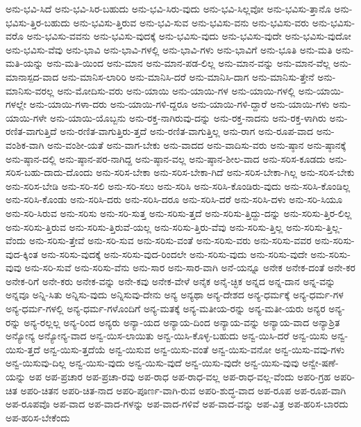 {ಅನು-ಭವಿ-ಸಿದೆ
ಅನು-ಭವಿ-ಸಿರ-ಬಹುದು
ಅನು-ಭವಿ-ಸಿರು-ವುದು
ಅನು-ಭವಿ-ಸಿಲ್ಲವೋ
ಅನು-ಭವಿಸು-ತ್ತಾನೊ
ಅನು-ಭವಿಸು-ತ್ತಿರ-ಬಹುದು
ಅನು-ಭವಿಸು-ತ್ತಿರುವ
ಅನು-ಭವಿ-ಸುವ
ಅನು-ಭವಿಸು-ವನು
ಅನು-ಭವಿಸು-ವರು
ಅನು-ಭವಿಸು-ವರೊ
ಅನು-ಭವಿಸು-ವವನು
ಅನು-ಭವಿಸು-ವುದಕ್ಕೆ
ಅನು-ಭವಿಸು-ವುದು
ಅನು-ಭವಿಸು-ವುದೇ
ಅನು-ಭವಿಸು-ವುದೋ
ಅನು-ಭವಿಸು-ವೆವು
ಅನು-ಭಾವಿ
ಅನು-ಭಾವಿ-ಗಳಲ್ಲಿ
ಅನು-ಭಾವಿ-ಗಳು
ಅನು-ಭಾವಿಗೆ
ಅನು-ಭೂತಿ
ಅನು-ಮತಿ
ಅನು-ಮತಿ-ಯನ್ನು
ಅನು-ಮತಿ-ಯಿಂದ
ಅನು-ಮಾನ
ಅನು-ಮಾನ-ಪಡ-ಲಿಲ್ಲ
ಅನು-ಮಾನ-ವನ್ನು
ಅನು-ಮಾನ-ವೆಲ್ಲ
ಅನು-ಮಾನಾಸ್ಪದ-ವಾದ
ಅನು-ಮಾನಿಸ-ಲಾರಿರಿ
ಅನು-ಮಾನಿಸಿ-ದರೆ
ಅನು-ಮಾನಿಸಿ-ದಾಗ
ಅನು-ಮಾನಿಸು-ತ್ತೇನೆ
ಅನು-ಮಾನಿಸು-ವರಲ್ಲ
ಅನು-ಮೋದಿಸು-ವರು
ಅನು-ಯಾಯಿ
ಅನು-ಯಾಯಿ-ಗಳ
ಅನು-ಯಾಯಿ-ಗಳಲ್ಲಿ
ಅನು-ಯಾಯಿ-ಗಳಲ್ಲೇ
ಅನು-ಯಾಯಿ-ಗಳಾ-ದರು
ಅನು-ಯಾಯಿ-ಗಳಿ-ದ್ದರೂ
ಅನು-ಯಾಯಿ-ಗಳಿ-ದ್ದಾರೆ
ಅನು-ಯಾಯಿ-ಗಳು
ಅನು-ಯಾಯಿ-ಗಳೇ
ಅನು-ಯಾಯಿ-ಯೊಬ್ಬನು
ಅನು-ರಕ್ತ-ನಾಗಿರುವು-ದನ್ನು
ಅನು-ರಕ್ತ-ನಾದನು
ಅನು-ರಕ್ತ-ಳಾಗಿರು
ಅನು-ರಣಿತ-ವಾಗುತ್ತಿದೆ
ಅನು-ರಣಿತ-ವಾಗುತ್ತಿರು-ತ್ತದೆ
ಅನು-ರಣಿತ-ವಾಗುತ್ತಿಲ್ಲ
ಅನು-ರಾಗ
ಅನು-ರೂಪ-ವಾದ
ಅನು-ವಂಶಿಕ-ವಾಗಿ
ಅನು-ವಂಶೀ-ಯತೆ
ಅನು-ವಾಗ-ಬೇಕು
ಅನು-ವಾದದ
ಅನು-ವಾದಿಸು-ವರು
ಅನು-ಷ್ಠಾನ
ಅನು-ಷ್ಠಾನಕ್ಕೆ
ಅನು-ಷ್ಠಾನ-ದಲ್ಲಿ
ಅನು-ಷ್ಠಾನ-ಪರ-ನಾಗಿದ್ದ
ಅನು-ಷ್ಠಾನ-ವಲ್ಲ
ಅನು-ಷ್ಠಾನ-ಶೀಲ-ವಾದ
ಅನು-ಸರಿಸ-ಕೂಡದು
ಅನು-ಸರಿಸ-ಬಹು-ದಾದು-ದೊಂದು
ಅನು-ಸರಿಸ-ಬೇಕಾ
ಅನು-ಸರಿಸ-ಬೇಕಾ-ಗಿದೆ
ಅನು-ಸರಿಸ-ಬೇಕಾ-ಗಿಲ್ಲ
ಅನು-ಸರಿಸ-ಬೇಕು
ಅನು-ಸರಿಸ-ಬೇಡಿ
ಅನು-ಸರಿ-ಸಲಿ
ಅನು-ಸರಿ-ಸಲು
ಅನು-ಸರಿಸಿ
ಅನು-ಸರಿಸಿ-ಕೊಂಡಿರು-ವುದು
ಅನು-ಸರಿಸಿ-ಕೊಂಡಿಲ್ಲ
ಅನು-ಸರಿಸಿ-ಕೊಂಡು
ಅನು-ಸರಿಸಿ-ದರು
ಅನು-ಸರಿಸಿ-ದರೂ
ಅನು-ಸರಿಸಿ-ದರೆ
ಅನು-ಸರಿಸಿ-ದಳು
ಅನು-ಸರಿ-ಸಿಯೂ
ಅನು-ಸರಿ-ಸಿರುವ
ಅನು-ಸರಿಸು
ಅನು-ಸರಿ-ಸುತ್ತ
ಅನು-ಸರಿಸು-ತ್ತದೆ
ಅನು-ಸರಿಸು-ತ್ತಿದ್ದು-ದನ್ನು
ಅನು-ಸರಿಸು-ತ್ತಿರ-ಲಿಲ್ಲ
ಅನು-ಸರಿಸು-ತ್ತಿರುವ
ಅನು-ಸರಿಸು-ತ್ತಿರುವೆ-ಯಲ್ಲ
ಅನು-ಸರಿಸು-ತ್ತಿರು-ವೆವು
ಅನು-ಸರಿಸು-ತ್ತಿಲ್ಲ
ಅನು-ಸರಿಸು-ತ್ತಿಲ್ಲ-ವೆಂದು
ಅನು-ಸರಿಸು-ತ್ತೇವೆ
ಅನು-ಸರಿ-ಸುವ
ಅನು-ಸರಿಸು-ವಂತೆ
ಅನು-ಸರಿಸು-ವರು
ಅನು-ಸರಿಸು-ವವರ
ಅನು-ಸರಿಸು-ವುದ-ಕ್ಕಿಂತ
ಅನು-ಸರಿಸು-ವುದಕ್ಕೆ
ಅನು-ಸರಿಸು-ವುದ-ರಿಂದಲೇ
ಅನು-ಸರಿಸು-ವುದು
ಅನು-ಸರಿಸು-ವುದೇ
ಅನು-ಸರಿಸು-ವುವು
ಅನು-ಸರಿ-ಸುವೆ
ಅನು-ಸರಿಸು-ವೆನು
ಅನು-ಸಾರ
ಅನು-ಸಾರ-ವಾಗಿ
ಅನೆ-ಯನ್ನೂ
ಅನೇಕ
ಅನೇಕ-ದಂತೆ
ಅನೇ-ಕರ
ಅನೇಕ-ರಿಗೆ
ಅನೇ-ಕರು
ಅನೇಕ-ವನ್ನು
ಅನೇ-ಕವು
ಅನೇಕ-ವೇಳೆ
ಅನೈಕ
ಅನೈ-ಚ್ಛಿಕ
ಅನ್ನದ
ಅನ್ನ-ದಾನ
ಅನ್ನ-ವನ್ನು
ಅನ್ನವೂ
ಅನ್ನಿ-ಸಿತು
ಅನ್ನಿಸು-ವುದು
ಅನ್ನಿಸುವು-ದೇನು
ಅನ್ಯ
ಅನ್ಯಥಾ
ಅನ್ಯ-ದೇಶದ
ಅನ್ಯ-ಧರ್ಮಕ್ಕೆ
ಅನ್ಯ-ಧರ್ಮ-ಗಳ
ಅನ್ಯ-ಧರ್ಮ-ಗಳಲ್ಲಿ
ಅನ್ಯ-ಧರ್ಮ-ಗಳೊಂದಿಗೆ
ಅನ್ಯ-ಮತಕ್ಕೆ
ಅನ್ಯ-ಮತೀಯ-ರನ್ನು
ಅನ್ಯ-ಮತೀ-ಯರು
ಅನ್ಯರ
ಅನ್ಯ-ರನ್ನು
ಅನ್ಯ-ರಲ್ಲಲ್ಲ
ಅನ್ಯ-ರಿಂದ
ಅನ್ಯರು
ಅನ್ಯಾ-ಯದ
ಅನ್ಯಾಯ-ದಿಂದ
ಅನ್ಯಾಯ-ವನ್ನು
ಅನ್ಯಾಯ-ವಾದ
ಅನ್ಯಾಶ್ರಿತ
ಅನ್ಯೋನ್ಯ
ಅನ್ಯೋನ್ಯ-ವಾದ
ಅನ್ವ-ಯಿಸ-ಲಾಯಿತು
ಅನ್ವ-ಯಿಸಿ-ಕೊಳ್ಳ-ಬಹುದು
ಅನ್ವ-ಯಿಸಿ-ದರೆ
ಅನ್ವ-ಯಿಸು
ಅನ್ವ-ಯಿಸು-ತ್ತದೆ
ಅನ್ವ-ಯಿಸು-ತ್ತದೆಯೆ
ಅನ್ವ-ಯಿಸುವ
ಅನ್ವ-ಯಿಸು-ವಂತೆ
ಅನ್ವ-ಯಿಸು-ವನೋ
ಅನ್ವ-ಯಿಸು-ವವು-ಗಳು
ಅನ್ವ-ಯಿಸುವು-ದಿಲ್ಲ
ಅನ್ವ-ಯಿಸು-ವುದು
ಅನ್ವ-ಯಿಸು-ವುದೆ
ಅನ್ವ-ಯಿಸು-ವುದೇ
ಅನ್ವ-ಯಿಸು-ವುವು
ಅನ್ವೇ-ಷಣೆ-ಯನ್ನು
ಅಪ
ಅಪ-ಪ್ರಚಾರ
ಅಪ-ಪ್ರಚಾ-ರವು
ಅಪ-ರಾಧ
ಅಪ-ರಾಧ-ವಲ್ಲ
ಅಪ-ರಾಧ-ವಲ್ಲ-ವೆಂದು
ಅಪರಿ-ಗ್ರಹ
ಅಪರಿ-ಚಿತ
ಅಪರಿ-ಚಿತನ
ಅಪರಿ-ಚಿತ-ನಾದ
ಅಪರಿ-ಪೂರ್ಣ-ವಾಗಿ-ರುವ
ಅಪರಿ-ಶುದ್ಧ-ವಾದ
ಅಪ-ರೂಪ
ಅಪ-ರೂಪ-ವಾಗಿ
ಅಪ-ರೂಪವೊ
ಅಪ-ವಾದ
ಅಪ-ವಾದ-ಗಳನ್ನು
ಅಪ-ವಾದ-ಗಳಿವೆ
ಅಪ-ವಾದ-ವನ್ನು
ಅಪ-ವಿತ್ರ
ಅಪ-ಹರಿಸ-ಬಾರದು
ಅಪ-ಹರಿಸ-ಬೇಕೆಂದು
}
